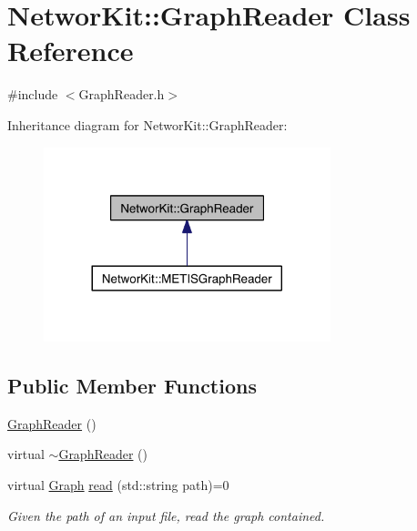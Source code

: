 \hypertarget{class_networ_kit_1_1_graph_reader}{\section{Networ\-Kit\-:\-:Graph\-Reader Class Reference}
\label{class_networ_kit_1_1_graph_reader}
}


{\ttfamily \#include $<$Graph\-Reader.\-h$>$}



Inheritance diagram for Networ\-Kit\-:\-:Graph\-Reader\-:\nopagebreak
\begin{figure}[H]
\begin{center}
\leavevmode
\includegraphics[width=236pt]{class_networ_kit_1_1_graph_reader__inherit__graph}
\end{center}
\end{figure}
\subsection*{Public Member Functions}
\begin{DoxyCompactItemize}
\item 
\hyperlink{class_networ_kit_1_1_graph_reader_ad7970634a2908b70b1603d7211761000}{Graph\-Reader} ()
\item 
virtual \hyperlink{class_networ_kit_1_1_graph_reader_a95fd03027a974deb1b90f64e7bb8ea99}{$\sim$\-Graph\-Reader} ()
\item 
virtual \hyperlink{class_networ_kit_1_1_graph}{Graph} \hyperlink{class_networ_kit_1_1_graph_reader_a0ba1d66a137702c06be52c648b95d572}{read} (std\-::string path)=0
\begin{DoxyCompactList}\small\item\em Given the path of an input file, read the graph contained. \end{DoxyCompactList}\end{DoxyCompactItemize}


